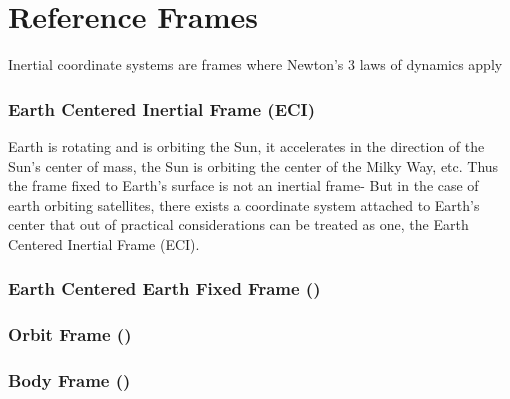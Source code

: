 

\section{Reference Frames} \cite{pope}

Inertial coordinate systems are frames where Newton's 3 laws of dynamics apply

\subsubsection{Earth Centered Inertial Frame (ECI)}
Earth is rotating and is orbiting the Sun, it accelerates in the direction of the Sun's center of mass, the Sun is orbiting the center of the Milky Way, etc. Thus the frame fixed to Earth's surface is not an inertial frame- But in the case of earth orbiting satellites, there exists a coordinate system attached to Earth's center that out of practical considerations can be treated as one, the Earth Centered Inertial Frame (ECI).



\subsubsection{Earth Centered Earth Fixed Frame ()}

\subsubsection{Orbit Frame ()}

\subsubsection{Body Frame ()}
